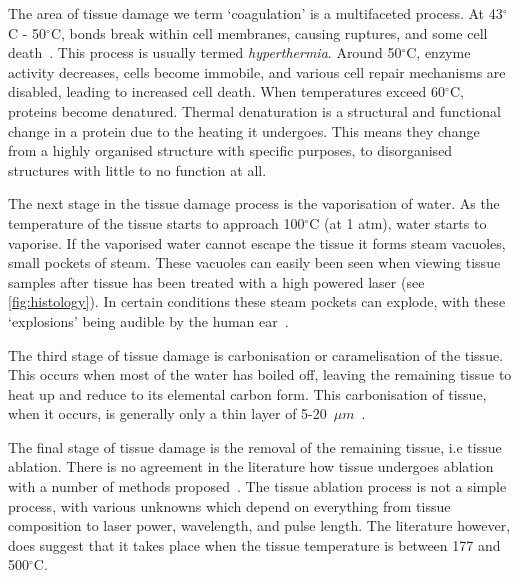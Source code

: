 The area of tissue damage we term `coagulation' is a multifaceted process. At 43$^{\circ}$C - 50$^{\circ}$C, bonds break within cell membranes, causing ruptures, and some cell death~\cite{welch2011optical,wright2015quantitative}. This process is usually termed \textit{hyperthermia}. Around 50$^{\circ}$C, enzyme activity decreases, cells become immobile, and various cell repair mechanisms are disabled, leading to increased cell death. When temperatures exceed 60$^{\circ}$C, proteins become denatured. Thermal denaturation is a structural and functional change in a protein due to the heating it undergoes. This means they change from a highly organised structure with specific purposes, to disorganised structures with little to no function at all.\cite{niemz2013laser}  %

The next stage in the tissue damage process is the vaporisation of water. As the temperature of the tissue starts to approach 100${^{\circ}}$C (at 1 atm), water starts to vaporise. If the vaporised water cannot escape the tissue it forms steam vacuoles, small pockets of steam. These vacuoles can easily been seen when viewing tissue samples after tissue has been treated with a high powered laser (see \cref{fig:histology}). In certain conditions these steam pockets can explode, with these `explosions' being audible by the human ear~\cite{petrella2013popcorn}.


The third stage of tissue damage is carbonisation or caramelisation of the tissue. This occurs when most of the water has boiled off, leaving the remaining tissue to heat up and reduce to its elemental carbon form. This carbonisation of tissue, when it occurs, is generally only a thin layer of 5-20~$\mu m$~\cite{welch2011optical,verdaasdonk1990explosive}.

The final stage of tissue damage is the removal of the remaining tissue, i.e tissue ablation. There is no agreement in the literature how tissue undergoes ablation with a number of methods proposed~\cite{vogel2003mechanisms,mckenzie1990physics}. The tissue ablation process is not a simple process, with various unknowns which depend on everything from tissue composition to laser power, wavelength, and pulse length. The literature however, does suggest that it takes place when the tissue temperature is between 177 and 500${^{\circ}}$C\cite{gerstmann1994char,mckenzie1986three,sagi1992heating}.

